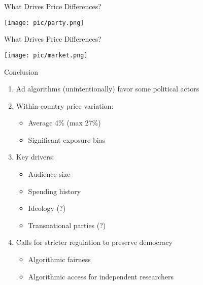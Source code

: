 \documentclass[
  ignorenonframetext,
]{beamer}
\begin{document}
\begin{frame}{What Drives Price Differences?}
\label{what-drives-price-differences-2}
\begin{center}
    \texttt{[image: pic/party.png]}
\end{center}
\end{frame}

\begin{frame}{What Drives Price Differences?}
\label{what-drives-price-differences-3}
\begin{center}
    \texttt{[image: pic/market.png]}
\end{center}
\end{frame}

\begin{frame}{Conclusion}
\label{conclusion}
\begin{enumerate}
  \item Ad algorithms (unintentionally) favor some political actors
  \vspace{.2cm}
  \pause

  \item Within-country price variation:
    \begin{itemize}
      \item Average 4\% (max 27\%)
      \item Significant exposure bias
    \end{itemize}
  \vspace{.2cm}
  \pause

  \item Key drivers:
    \begin{itemize}
      \item Audience size
      \item Spending history
      \item Ideology (?)
      \item Transnational parties (?)
    \end{itemize}
  \vspace{.2cm}
  \pause

  \item Calls for stricter regulation to preserve democracy
    \begin{itemize}
      \item Algorithmic fairness
      \item Algorithmic access for independent researchers
    \end{itemize}
\end{enumerate}
\end{frame}
\end{document}
